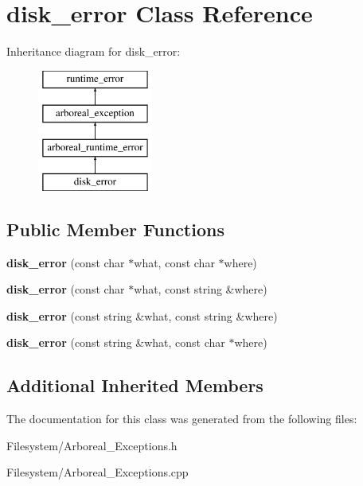\hypertarget{classdisk__error}{}\section{disk\+\_\+error Class Reference}
\label{classdisk__error}
Inheritance diagram for disk\+\_\+error\+:\begin{figure}[H]
\begin{center}
\leavevmode
\includegraphics[height=4.000000cm]{classdisk__error}
\end{center}
\end{figure}
\subsection*{Public Member Functions}
\begin{DoxyCompactItemize}
\item 
\mbox{\label{classdisk__error_a1f3a9f8326a8d192d3a54e698d09d29d}} 
{\bfseries disk\+\_\+error} (const char $\ast$what, const char $\ast$where)
\item 
\mbox{\label{classdisk__error_a03937aabd05ba77b2e49fff4c039b047}} 
{\bfseries disk\+\_\+error} (const char $\ast$what, const string \&where)
\item 
\mbox{\label{classdisk__error_afb8e69ac35d47d5ed1bcc8b764baea4b}} 
{\bfseries disk\+\_\+error} (const string \&what, const string \&where)
\item 
\mbox{\label{classdisk__error_aea5a9df17b57607f55f82de0cd384052}} 
{\bfseries disk\+\_\+error} (const string \&what, const char $\ast$where)
\end{DoxyCompactItemize}
\subsection*{Additional Inherited Members}


The documentation for this class was generated from the following files\+:\begin{DoxyCompactItemize}
\item 
Filesystem/Arboreal\+\_\+\+Exceptions.\+h\item 
Filesystem/Arboreal\+\_\+\+Exceptions.\+cpp\end{DoxyCompactItemize}
